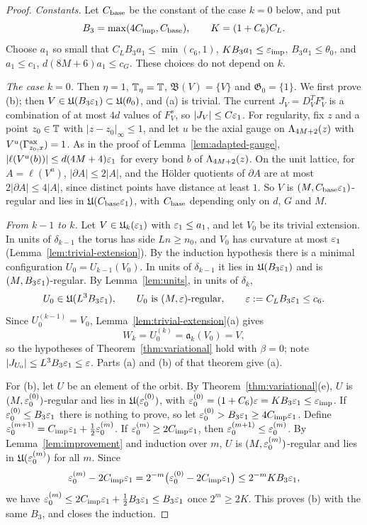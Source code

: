 \begin{proof}
\emph{Constants.} Let $C_{\rm base}$ be the constant of the case $k=0$ below, and put
\[
B_3=\max(4C_{\rm imp},C_{\rm base}),\qquad K=(1+C_6)C_L .
\]
Choose $a_1$ so small that $C_LB_3a_1\le\min(c_6,1)$, $KB_3a_1\le\varepsilon_{\rm imp}$, $B_3a_1\le\theta_0$, and $a_1\le c_1$, $d(8M+6)a_1\le c_G$. These choices do not depend on $k$.

\emph{The case $k=0$.} Then $\eta=1$, $\mathbb T_\eta=\mathbb T$, $\mathfrak B(V)=\{V\}$ and $\mathfrak G_0=\{1\}$. We first prove (b); then $V\in\mathfrak U(B_3\varepsilon_1)\subset\mathfrak U(\theta_0)$, and (a) is trivial. The current $J_V=D^T_VF^s_V$ is a combination of at most $4d$ values of $F^s_V$, so $|J_V|\le C\varepsilon_1$. For regularity, fix $z$ and a point $z_0\in\mathbb T$ with $|z-z_0|_\infty\le1$, and let $u$ be the axial gauge on $\Lambda_{4M+2}(z)$ with $V^u(\Gamma^{\rm ax}_{z_0,x})=1$. As in the proof of Lemma~\ref{lem:adapted-gauge}, $|\ell(V^u(b))|\le d(4M+4)\varepsilon_1$ for every bond $b$ of $\Lambda_{4M+2}(z)$. On the unit lattice, for $A=\ell(V^u)$, $|\partial A|\le2|A|$, and the H\"older quotients of $\partial A$ are at most $2|\partial A|\le4|A|$, since distinct points have distance at least $1$. So $V$ is $(M,C_{\rm base}\varepsilon_1)$-regular and lies in $\mathfrak U(C_{\rm base}\varepsilon_1)$, with $C_{\rm base}$ depending only on $d$, $G$ and $M$.

\emph{From $k-1$ to $k$.} Let $V\in\mathfrak U_k(\varepsilon_1)$ with $\varepsilon_1\le a_1$, and let $V_0$ be its trivial extension. In units of $\delta_{k-1}$ the torus has side $Ln\ge n_0$, and $V_0$ has curvature at most $\varepsilon_1$ (Lemma~\ref{lem:trivial-extension}). By the induction hypothesis there is a minimal configuration $U_0=U_{k-1}(V_0)$. In units of $\delta_{k-1}$ it lies in $\mathfrak U(B_3\varepsilon_1)$ and is $(M,B_3\varepsilon_1)$-regular. By Lemma~\ref{lem:units}, in units of $\delta_k$,
\[
U_0\in\mathfrak U(L^3B_3\eps_1),\qquad U_0\ \text{is}\ (M,\eps)\text{-regular},\qquad\eps:=C_LB_3\eps_1\le c_6 .
\]
Since $U_0^{(k-1)}=V_0$, Lemma~\ref{lem:trivial-extension}(a) gives
\[
W_k=U_0^{(k)}=\mathfrak a_k(V_0)=V ,
\]
so the hypotheses of Theorem~\ref{thm:variational} hold with $\beta=0$; note $|J_{U_0}|\le L^3B_3\varepsilon_1\le\varepsilon$. Parts (a) and (b) of that theorem give (a).

For (b), let $U$ be an element of the orbit. By Theorem~\ref{thm:variational}(e), $U$ is $(M,\varepsilon_0^{(0)})$-regular and lies in $\mathfrak U(\varepsilon_0^{(0)})$, with $\varepsilon_0^{(0)}=(1+C_6)\varepsilon=KB_3\varepsilon_1\le\varepsilon_{\rm imp}$. If $\varepsilon_0^{(0)}\le B_3\varepsilon_1$ there is nothing to prove, so let $\varepsilon_0^{(0)}>B_3\varepsilon_1\ge4C_{\rm imp}\varepsilon_1$. Define $\varepsilon_0^{(m+1)}=C_{\rm imp}\varepsilon_1+\frac12\varepsilon_0^{(m)}$. If $\varepsilon_0^{(m)}\ge2C_{\rm imp}\varepsilon_1$, then $\varepsilon_0^{(m+1)}\le\varepsilon_0^{(m)}$. By Lemma~\ref{lem:improvement} and induction over $m$, $U$ is $(M,\varepsilon_0^{(m)})$-regular and lies in $\mathfrak U(\varepsilon_0^{(m)})$ for all $m$. Since
\[
\varepsilon_0^{(m)}-2C_{\rm imp}\varepsilon_1=2^{-m}\big(\varepsilon_0^{(0)}-2C_{\rm imp}\varepsilon_1\big)\le2^{-m}KB_3\varepsilon_1 ,
\]
we have $\varepsilon_0^{(m)}\le2C_{\rm imp}\varepsilon_1+\frac12B_3\varepsilon_1\le B_3\varepsilon_1$ once $2^{m}\ge2K$. This proves (b) with the same $B_3$, and closes the induction.
\end{proof}

